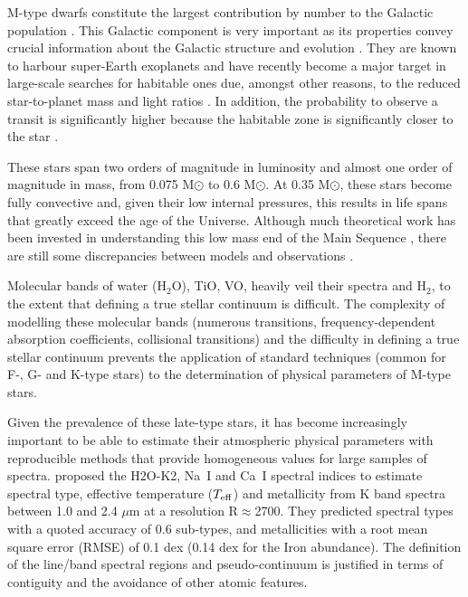 
M-type dwarfs constitute the largest contribution by number to the
Galactic population \citep{2010AJ....139.2679B}. This Galactic
component is very important as its properties convey crucial
information about the Galactic structure and
evolution \citep{2013A&A...556A.110B}. They are known to harbour
super-Earth exoplanets \citep{2013A&A...556A.110B} and have recently
become a major target in large-scale searches for habitable ones due,
amongst other reasons, to the reduced star-to-planet mass and light
ratios \citep{2015A&A...577A.128A}. In addition, the probability to observe a
transit is significantly higher because the habitable zone is
significantly closer to the star \citep{Shields20161}.

These stars span two orders of magnitude in luminosity and almost one
order of magnitude in mass, from 0.075 M$\odot$ to 0.6 M$\odot$. At
0.35 M$\odot$, these stars become fully convective and, given their
low internal pressures, this results in life spans that greatly exceed
the age of the Universe. Although much theoretical work has been
invested in understanding this low mass end of the Main
Sequence \citep{2008ApJ...676.1262B}, there are still some
discrepancies between models and observations \citep[see e.g.][for an
account of the observed inflated radii and cooler temperatures with
respect to model predictions]{2013AN....334....4T}.

Molecular bands of water (H$_2$O), TiO, VO,
heavily veil their spectra and H$_2$, to the extent that defining a true stellar
continuum is difficult. The complexity of modelling
these molecular bands (numerous transitions, frequency-dependent
absorption coefficients, collisional transitions) and the difficulty in
defining a true stellar continuum prevents the application of standard
techniques (common for F-, G- and K-type stars) to the determination
of physical parameters of M-type stars.

Given the prevalence of these late-type stars, it has become
increasingly important to be able to estimate their atmospheric
physical parameters with reproducible methods that provide homogeneous
values for large samples of spectra. \cite{2012ApJ...748...93R}
proposed the H2O-K2, Na~{\sc I} and Ca~{\sc I} spectral indices to
estimate spectral type, effective temperature ($T_{\rm eff}$) and
metallicity from K band spectra between 1.0 and 2.4 $\mu$m at a
resolution R$\approx$2700. They predicted spectral types with a quoted
accuracy of 0.6 sub-types, and metallicities with a root mean square
error (RMSE) of 0.1 dex (0.14 dex for the Iron abundance). The
definition of the line/band spectral regions and pseudo-continuum is
justified in terms of contiguity and the avoidance of other atomic
features. 

